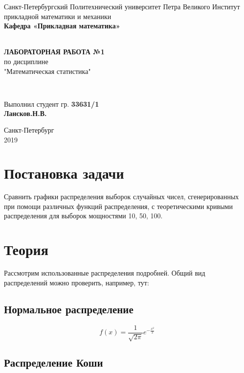 \documentclass[12pt]{article}
\renewcommand{\listoffigures}{\begingroup  %
\tocsection
\tocfile{\listfigurename}{lof}
\endgroup}
\renewcommand{\listoftables}{\begingroup  %
\tocsection
\tocfile{\listtablename}{lot}
\endgroup}
\begin{document}
\begin{titlepage}
	\center
		Санкт-Петербургский Политехнический 
		университет Петра Великого
		Институт прикладной математики и механики
		\\ \textbf{Кафедра «Прикладная математика»}

	\vfill ~
	\textbf{
		\\ \large ЛАБОРАТОРНАЯ РАБОТА №1
	}
	\\	по дисциплине 
	\\	"Математическая статистика"

	\vfill ~

	Выполнил студент гр. \textbf{33631/1} \\
	\textbf{Лансков.Н.В.} \\ 

\vfill

{\large}	Санкт-Петербург
\\ 2019
\end{titlepage}


\tableofcontents 
\newpage
\listoffigures
\newpage

\section{Постановка задачи}
Сравнить графики распределения выборок случайных чисел, сгенерированных при помощи различных функций распределения, с теоретическими кривыми распределения для выборок мощностями 10, 50, 100.

\section{Теория}
Рассмотрим использованные распределения подробней. Общий вид распределений можно проверить, например, тут: \cite{wiki}

\subsection{Нормальное распределение}

\begin{equation}
f(x)= \frac{1}{\sqrt{2\pi}}e^{-\frac{x^2}{2}}
\end{equation}

\subsection{Распределение Коши}
\end{document}
